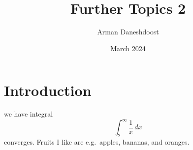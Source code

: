 \documentclass{article}
\title{Further Topics 2}
\author{Arman Daneshdoost}
\date{March 2024}
\newcommand{\intinf}[1]{\int_{#1}^{\infty}} %
\newcommand{\eg}{e.g.\ } %
\begin{document}
	\maketitle
	
	\section{Introduction}
	we have integral 
	\[\intinf{2} \frac{1}{x} \, dx\]
	converges.
	Fruits I like are \eg apples, bananas, and oranges.
\end{document}
